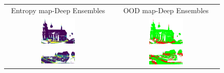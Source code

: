     \begin{figure}[h!]
        \centering
        \begin{tabular}{cc}
            Entropy map-Deep Ensembles & OOD map-Deep Ensembles \\
            \includegraphics[width=0.33\textwidth, height=0.18\textheight]{images/ood_imgs/de_sem3d/de_ent_10_1.pdf}& 
            \includegraphics[width=0.33\textwidth, height=0.18\textheight]{images/ood_imgs/de_sem3d/de_ent_ood_auroc_1.pdf}\\

            \includegraphics[width=0.33\textwidth, height=0.18\textheight]{images/ood_imgs/de_sem3d/de_ent_10_2.pdf}& 
            \includegraphics[width=0.33\textwidth, height=0.18\textheight]{images/ood_imgs/de_sem3d/de_ent_ood_auroc_2.pdf}\\


\end{tabular}
\end{figure}
